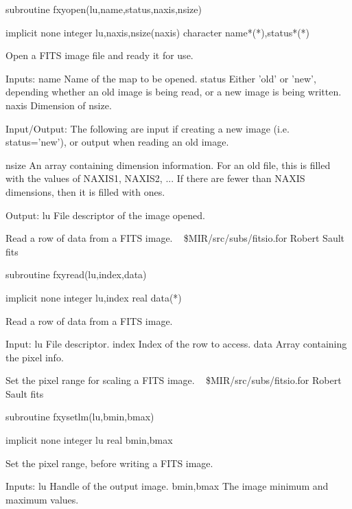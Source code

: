\par{\tenpoint
{\eightpoint\begintt
        subroutine fxyopen(lu,name,status,naxis,nsize)

        implicit none
        integer lu,naxis,nsize(naxis)
        character name*(*),status*(*)

  Open a FITS image file and ready it for use.

  Inputs:
    name       Name of the map to be opened.
    status     Either 'old' or 'new', depending whether an old image
               is being read, or a new image is being written.
    naxis      Dimension of nsize.

  Input/Output:
    The following are input if creating a new image (i.e. status='new'),
    or output when reading an old image.

    nsize      An array containing dimension information. For an old
               file, this is filled with the values of NAXIS1, NAXIS2, ...
               If there are fewer than NAXIS dimensions, then it is 
               filled with ones.

  Output:
    lu         File descriptor of the image opened.
\endtt}
\par}
%
\noindent Read a row of data from a FITS image.
\newline \ 
\newline {} \$MIR/src/subs/fitsio.for
\newline {} Robert Sault
\newline {} fits
\par{\tenpoint
{\eightpoint\begintt
        subroutine fxyread(lu,index,data)

        implicit none
        integer lu,index
        real data(*)

  Read a row of data from a FITS image.

  Input:
    lu         File descriptor.
    index      Index of the row to access.
    data       Array containing the pixel info.
\endtt}
\par}
%
\noindent Set the pixel range for scaling a FITS image.
\newline \ 
\newline {} \$MIR/src/subs/fitsio.for
\newline {} Robert Sault
\newline \abox{Keywords:} fits
\par{\tenpoint
{\eightpoint\begintt
        subroutine fxysetlm(lu,bmin,bmax)

        implicit none
        integer lu
        real bmin,bmax

  Set the pixel range, before writing a FITS image.

  Inputs:
    lu         Handle of the output image.
    bmin,bmax  The image minimum and maximum values.
\endtt}
\par}
